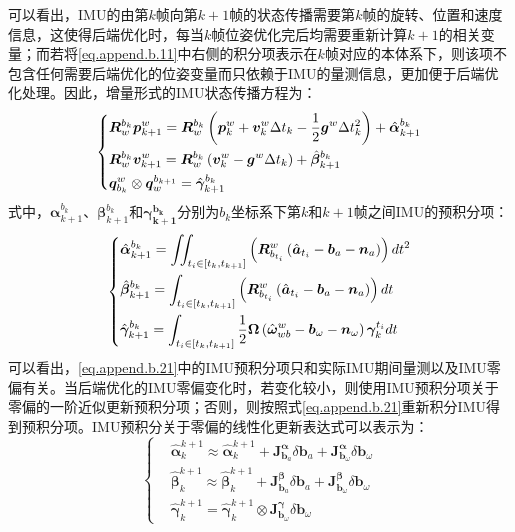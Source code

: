 可以看出，IMU的由第$k$帧向第$k+1$帧的状态传播需要第$k$帧的旋转、位置和速度信息，这使得后端优化时，每当$k$帧位姿优化完后均需要重新计算$k+1$的相关变量；而若将\ref{eq.append.b.11}中右侧的积分项表示在$k$帧对应的本体系下，则该项不包含任何需要后端优化的位姿变量而只依赖于IMU的量测信息，更加便于后端优化处理。因此，增量形式的IMU状态传播方程为：
\begin{equation}
\centering
\left\{
\begin{aligned}
	&\bm{R}_w^{b_k}\bm{p}_{k+1}^w=\bm{R}_w^{b_k}\left(\bm{p}_k^w+\bm{v}_k^w\Delta t_k-\frac{1}{2}\bm{g}^w\Delta t_k^2\right)+\hat{\bm{\alpha}}_{k+1}^{b_k}\\
	&\bm{R}_w^{b_k}\bm{v}_{k+1}^w=\bm{R}_w^{b_k}\left(\bm{v}_k^w-\bm{g}^w\Delta t_k\right)+\hat{\bm{\beta}}_{k+1}^{b_k}\\
	&\bm{q}_{b_{k}}^w\otimes\bm{q}_w^{b_{k+1}}=\hat{\bm{\gamma}}_{k+1}^{b_k}
\end{aligned}
\right.
\end{equation}
式中，$\bm{\alpha}_{k+1}^{b_k}$、$\bm{\beta}_{k+1}^{b_k}$和$\bm{\gamma_{k+1}^{b_k}}$分别为$b_k$坐标系下第$k$和$k+1$帧之间IMU的预积分项：
\begin{equation}
\centering
\left\{
\begin{aligned}
&\hat{\bm{\alpha}}_{k+1}^{b_k}=\iint_{t_i\in\left[t_k,t_{k+1}\right]}\left(\bm{R}_{b_{t_i}}^w\left(\hat{\bm{a}}_{t_i}-\bm{b}_a-\bm{n}_a\right)\right)dt^2\\
&\hat{\bm{\beta}}_{k+1}^{b_k}=\int_{t_i\in\left[t_k,t_{k+1}\right]}\left(\bm{R}_{b_{t_i}}^w\left(\hat{\bm{a}}_{t_i}-\bm{b}_a-\bm{n}_a\right)\right)dt\\
&\hat{\bm{\gamma}}_{k+1}^{b_k}=\int_{t_i\in\left[t_k,t_{k+1}\right]}\frac{1}{2}\bm{\Omega}\left(\hat{\bm{\omega}}_{wb}^w-\bm{b}_\omega-\bm{n}_\omega\right)\bm{\gamma}_k^{t_i}dt
\end{aligned}
\right.
\label{eq.append.b.21}
\end{equation}
可以看出，\ref{eq.append.b.21}中的IMU预积分项只和实际IMU期间量测以及IMU零偏有关。当后端优化的IMU零偏变化时，若变化较小，则使用IMU预积分项关于零偏的一阶近似更新预积分项；否则，则按照式\ref{eq.append.b.21}重新积分IMU得到预积分项。IMU预积分关于零偏的线性化更新表达式可以表示为：
\begin{equation}
\left\{
\begin{aligned}
&\hat{\bm{\alpha}}_k^{k+1}\approx\hat{\bm{\alpha}}_k^{k+1}+\bm{J}^{\bm{\alpha}}_{\bm{b}_a}\delta\bm{b}_a+\bm{J}^{\bm{\alpha}}_{\bm{b}_\omega}\delta\bm{b}_\omega\\
&\hat{\bm{\beta}}_k^{k+1}\approx\hat{\bm{\beta}}_k^{k+1}+\bm{J}^{\bm{\beta}}_{\bm{b}_a}\delta\bm{b}_a+\bm{J}^{\bm{\beta}}_{\bm{b}_\omega}\delta\bm{b}_\omega\\
&\hat{\bm{\gamma}}_k^{k+1}=\hat{\bm{\gamma}}_k^{k+1}\otimes\bm{J}^{\bm{\gamma}}_{\bm{b}_\omega}\delta\bm{b}_\omega
\end{aligned}
\right.
\label{eq.append.b.13}
\end{equation}
